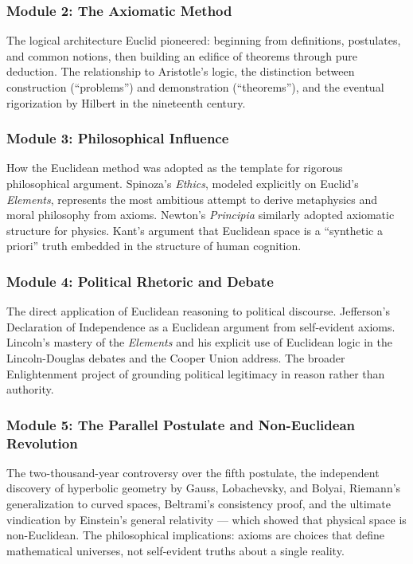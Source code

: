 \documentclass[11pt,letterpaper]{article}
\begin{document}
\subsubsection{Module 2: The Axiomatic Method}
The logical architecture Euclid pioneered: beginning from definitions, postulates, and common notions, then building an edifice of theorems through pure deduction. The relationship to Aristotle's logic, the distinction between construction (``problems'') and demonstration (``theorems''), and the eventual rigorization by Hilbert in the nineteenth century.

\subsubsection{Module 3: Philosophical Influence}
How the Euclidean method was adopted as the template for rigorous philosophical argument. Spinoza's \textit{Ethics}, modeled explicitly on Euclid's \textit{Elements}, represents the most ambitious attempt to derive metaphysics and moral philosophy from axioms. Newton's \textit{Principia} similarly adopted axiomatic structure for physics. Kant's argument that Euclidean space is a ``synthetic a priori'' truth embedded in the structure of human cognition.

\subsubsection{Module 4: Political Rhetoric and Debate}
The direct application of Euclidean reasoning to political discourse. Jefferson's Declaration of Independence as a Euclidean argument from self-evident axioms. Lincoln's mastery of the \textit{Elements} and his explicit use of Euclidean logic in the Lincoln-Douglas debates and the Cooper Union address. The broader Enlightenment project of grounding political legitimacy in reason rather than authority.

\subsubsection{Module 5: The Parallel Postulate and Non-Euclidean Revolution}
The two-thousand-year controversy over the fifth postulate, the independent discovery of hyperbolic geometry by Gauss, Lobachevsky, and Bolyai, Riemann's generalization to curved spaces, Beltrami's consistency proof, and the ultimate vindication by Einstein's general relativity --- which showed that physical space is non-Euclidean. The philosophical implications: axioms are choices that define mathematical universes, not self-evident truths about a single reality.
\end{document}
